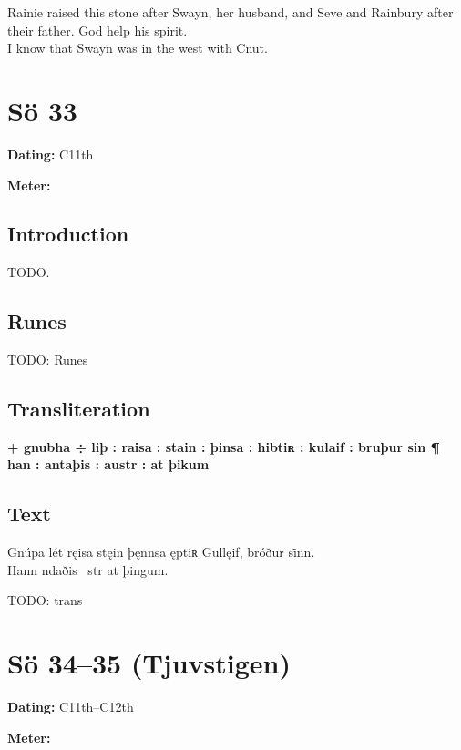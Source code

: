 \bpb Rainie raised this stone after Swayn, her husband, and Seve and Rainbury after their father. God help his spirit. \\
I know that Swayn was in the west with Cnut.\epb\epg

\sectionline\clearpage


\section{Sö 33}

\begin{flushright}%
\textbf{Dating:} C11th

\textbf{Meter:} \Fornyrdislag
\end{flushright}%

\subsection{Introduction}

TODO.

\subsection{Runes}

TODO: Runes%

\subsection{Transliteration}

\textbf{+ gnubha ÷ liþ : raisa : stain : þinsa : hibtiʀ : kulaif : bruþur sin ¶ han : antaþis : austr : at þikum}

\subsection{Text}

\bpg\bpa[0]%
Gnúpa lét ręisa stęin þęnnsa ęptiʀ Gullęif, bróður si̇nn. \\
Hann ndaðis \hld\ str at þingum.\epa

\bpb TODO: trans\epb\epg

\sectionline\clearpage


\section{Sö 34--35 (Tjuvstigen)}

\begin{flushright}%
\textbf{Dating:} C11th--C12th

\textbf{Meter:} \Fornyrdislag
\end{flushright}%

